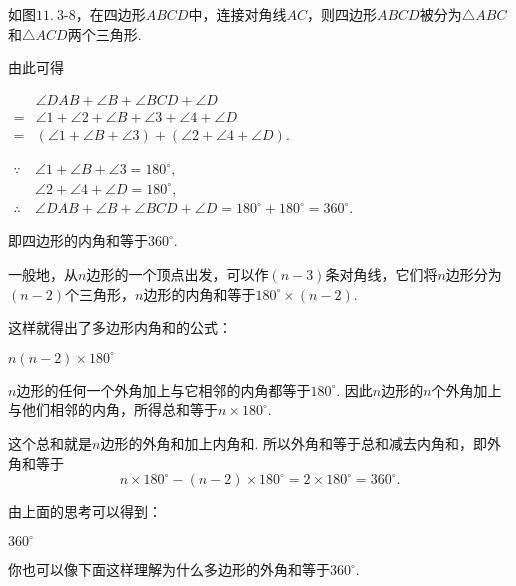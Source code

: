 \documentclass[UTF8,fontset=macnew]{book} %
\begin{document}
				如图$11.\ 3$-$8$，在四边形$ABCD$中，连接对角线$AC$，则四边形$ABCD$被分为$\triangle ABC$和$\triangle ACD$两个三角形.
				
				由此可得
				
				$\begin{aligned}&\angle DAB+\angle B+\angle BCD+\angle D\\=&\angle 1+\angle 2+\angle B+\angle 3+\angle 4+\angle D\\=&(\angle 1+\angle B+\angle 3)+(\angle 2+\angle 4+\angle D).\end{aligned}$
				
				$\begin{aligned}\because \ &\angle 1+\angle B+\angle 3=180^{\circ},\\&\angle 2+\angle 4+\angle D=180^{\circ},\\\therefore \ &\angle DAB+\angle B+\angle BCD+\angle D=180^{\circ}+180^{\circ}=360^{\circ}.\end{aligned}$
			
				\noindent 即四边形的内角和等于$360^{\circ}.$
				
				一般地，从$n$边形的一个顶点出发，可以作$(n-3)$条对角线，它们将$n$边形分为$(n-2)$个三角形，$n$边形的内角和等于$180^{\circ} \times (n-2).$
				
				这样就得出了多边形内角和的公式：
				
				\textcolor[RGB]{4,165,218}{$n$$(n-2)\times 180^{\circ}$}
				
				$n$边形的任何一个外角加上与它相邻的内角都等于$180^{\circ}$. 因此$n$边形的$n$个外角加上与他们相邻的内角，所得总和等于$n\times 180^{\circ}.$
				
				这个总和就是$n$边形的外角和加上内角和. 所以外角和等于总和减去内角和，即外角和等于
				$$n\times 180^{\circ} - (n-2)\times 180^{\circ}=2\times 180^{\circ}=360^{\circ}.$$
				
				由上面的思考可以得到：
				
				\textcolor[RGB]{4,165,218}{$360^{\circ}$}
				
				你也可以像下面这样理解为什么多边形的外角和等于$360^{\circ}$.
				
\end{document}
